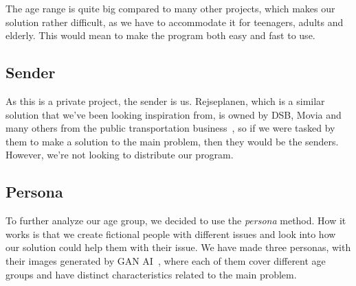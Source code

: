 The age range is quite big compared to many other projects, which makes our solution rather difficult, as we have to
accommodate it for teenagers, adults and elderly.
This would mean to make the program both easy and fast to use.

\subsection{Sender}\label{subsec:sender}

As this is a private project, the sender is us.
Rejseplanen, which is a similar solution that we've been looking inspiration from, is owned by DSB, Movia and many
others from the public transportation business~\cite{om_rejseplanen}, so if we were tasked by them to make a solution to
the main problem, then they would be the senders.
However, we're not looking to distribute our program.

\subsection{Persona}\label{subsec:persona}

To further analyze our age group, we decided to use the \textit{persona} method.
How it works is that we create fictional people with different issues and look into how our solution could help them
with their issue.
We have made three personas, with their images generated by GAN AI~\cite{thispersondoesnotexist}, where each of them
cover different age groups and have distinct characteristics related to the main problem.


\renewcommand{\arraystretch}{1.5}

